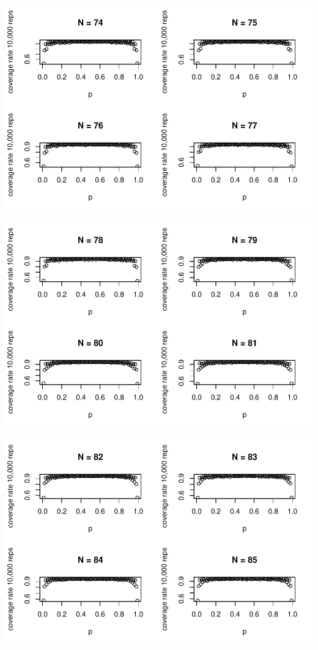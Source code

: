 \documentclass{article}\usepackage[]{graphicx}\usepackage[]{color}
\makeatletter
\def\maxwidth{ %
  \ifdim\Gin@nat@width>\linewidth
    \linewidth
  \else
    \Gin@nat@width
  \fi
}
\newenvironment{knitrout}{}{} %
\makeatother
\begin{document}
\begin{enumerate}
\begin{knitrout}
{}




{\centering \includegraphics[width=\maxwidth]{figure/prob1_final-8} 

}




{\centering \includegraphics[width=\maxwidth]{figure/prob1_final-9} 

}




{\centering \includegraphics[width=\maxwidth]{figure/prob1_final-10} 

}
\end{knitrout}
\end{enumerate}
\end{document}
